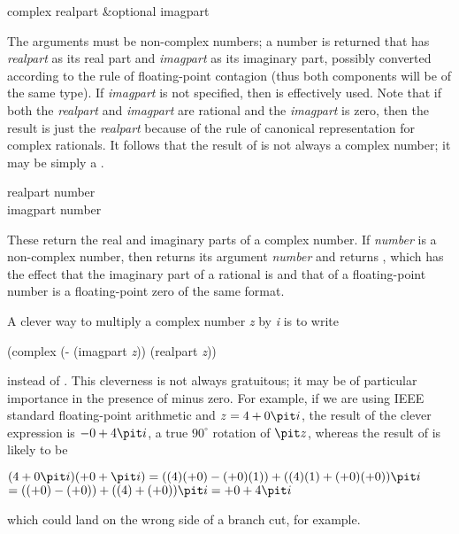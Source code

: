 \begin{defun}[Function]
complex realpart &optional imagpart

The arguments must be non-complex numbers; a number is returned
that has {\it realpart} as its real part and {\it imagpart} as its imaginary
part, possibly converted according to the rule of floating-point
contagion (thus both components will be of the same type).
If {\it imagpart} is not specified,
then  is
effectively used.  Note that if both the {\it realpart} and {\it imagpart} are
rational and the {\it imagpart} is zero, then the result is just the
{\it realpart} because of the rule of canonical representation
for complex rationals.  It follows that the result of 
is not always a complex number; it may be simply a .
\end{defun}

\begin{defun}[Function]
realpart number \\
imagpart number

These return the real and imaginary parts of a complex number.  If
{\it number} is a non-complex number, then  returns its
argument {\it number} and 
returns , which
has the effect that the imaginary part of a rational is  and that of
a floating-point number is a floating-point zero of the same format.

\begin{newer}
A clever way to multiply a complex number {\it z} by {\it i} is to write
\begin{lisp}
(complex (- (imagpart {\it z})) (realpart {\it z}))
\end{lisp}
instead of .  This cleverness is not always
gratuitous; it may be of particular importance in the presence of minus
zero.  For example, if we are using IEEE standard floating-point arithmetic
and $z=4+0{\it i}$, the result of the clever expression is $-0+4{\it i}$, a true
$90^\circ$ rotation of ${\it z}$, whereas the result of 
is likely to be
\begin{tabbing}
$ (4+0{\it i\/})(+0+{\it i\/}) = ((4)(+0) - (+0)(1)) + ((4)(1) + (+0)(+0)){\it i} $ \\
\hskip2pc$ = ((+0)-(+0))+((4)+(+0)){\it i} = +0+4{\it i} $
\end{tabbing}
which could
land on the wrong side of a branch cut, for example.
\end{newer}
\end{defun}


